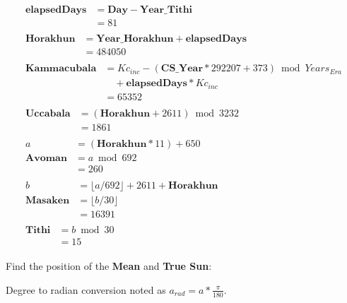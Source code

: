 \documentclass[11pt,oneside]{memoir-article}
\begin{document}
\begin{align}
\begin{split}
   \mathbf{elapsedDays} &= \mathbf{Day} - \mathbf{Year\_Tithi}\\
                        &= 81
\end{split}\\
\begin{split}
   \mathbf{Horakhun}    &= \mathbf{Year\_Horakhun} + \mathbf{elapsedDays}\\
                        &= 484050
\end{split}\\
\begin{split}
  \mathbf{Kammacubala}  &= Kc_{inc} - (\mathbf{CS\_Year} * 292207 + 373) \bmod Years_{Era}\\
                        & \quad + \mathbf{elapsedDays} * Kc_{inc}\\
                        &= 65352
\end{split}\\
\begin{split}
  \mathbf{Uccabala}     &= (\mathbf{Horakhun} + 2611) \bmod 3232\\
                        &= 1861
\end{split}\\
\begin{split}
                      a &= (\mathbf{Horakhun} * 11) + 650\\
        \mathbf{Avoman} &= a \bmod 692\\
                        &= 260
\end{split}\\
\begin{split}
                      b &= \lfloor a / 692 \rfloor + 2611 + \mathbf{Horakhun}\\
       \mathbf{Masaken} &= \lfloor b / 30 \rfloor\\
                        &= 16391
\end{split}\\
\begin{split}
         \mathbf{Tithi} &= b \bmod 30\\
                        &= 15
\end{split}
\end{align}

Find the position of the \textbf{Mean} and \textbf{True Sun}:

Degree to radian conversion noted as $a_{rad} = a * \frac{\pi}{180}$.
\end{document}
